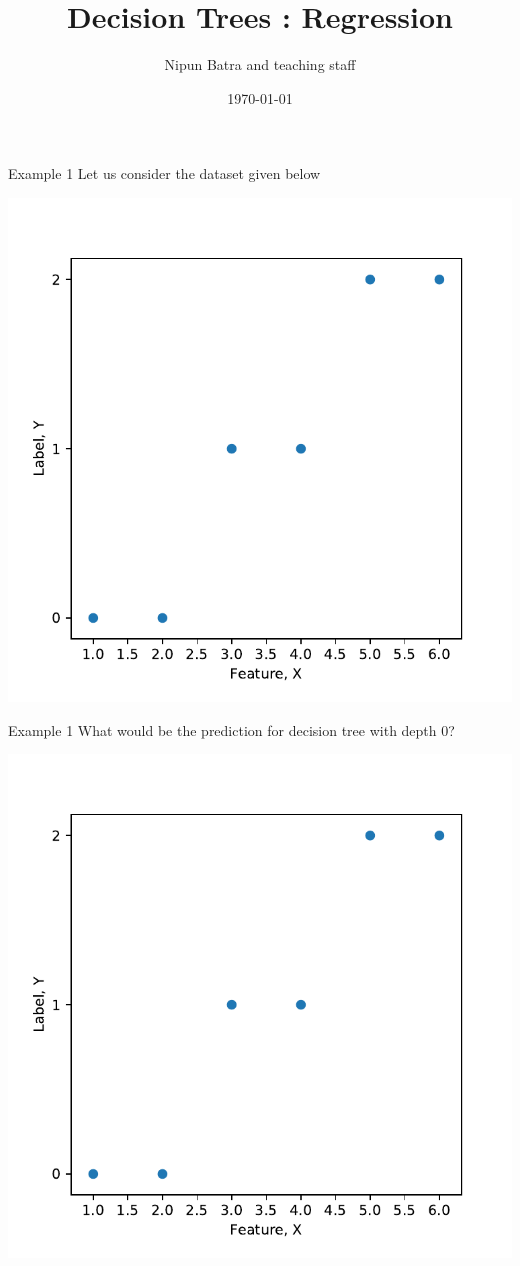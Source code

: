 \documentclass{beamer}
\title{Decision Trees : Regression}
\date{\today}
\author{Nipun Batra and teaching staff}
\institute{IIT Gandhinagar}
\begin{document}
	\maketitle
	
	\begin{frame}{Example 1}
	Let us consider the dataset given below
	\begin{center}
	\includegraphics[scale=0.5]{dataset}
	\end{center}
	\end{frame}

	\begin{frame}{Example 1}
	What would be the prediction for decision tree with depth 0?
	\begin{center}
	\includegraphics[scale=0.5]{dataset}
	\end{center}
	\end{frame}
\end{document}
